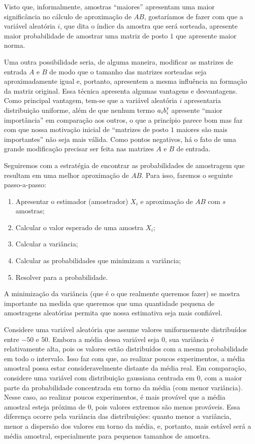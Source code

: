
Visto que, informalmente, amostras ``maiores'' apresentam uma maior significância no cálculo de aproximação de $AB$, gostaríamos de fazer com que a variável aleatória $i$, que dita o índice da amostra que será sorteada, apresente maior probabilidade de amostrar uma matriz de posto $1$ que apresente maior norma.

Uma outra possibilidade seria, de alguma maneira, modificar as matrizes de entrada $A$ e $B$ de modo que o tamanho das matrizes sorteadas seja aproximadamente igual e, portanto, apresentem a mesma influência na formação da matriz original. Essa técnica apresenta algumas vantagens e desvantagens. Como principal vantagem, tem-se que a variável aleatória $i$ apresentaria distribuição uniforme, além de que nenhum termo $a_ib_i^{\scriptscriptstyle\mathsf{T}\mkern-1mu}$ apresente ``maior importância'' em comparação aos outros, o que a princípio parece bom mas faz com que nossa motivação inicial de ``matrizes de posto $1$ maiores são mais importantes'' não seja mais válida. Como pontos negativos, há o fato de uma grande modificação precisar ser feita nas matrizes $A$ e $B$ de entrada.

Seguiremos com a estratégia de encontrar as probabilidades de amostragem que resultam em uma melhor aproximação de $AB$. Para isso, faremos o seguinte passo-a-passo:

\begin{enumerate}
  \item Apresentar o estimador (amostrador) $X_i$ e aproximação de $AB$ com $s$ amostras;
  \item Calcular o valor esperado de uma amostra $X_i$;
  \item Calcular a variância;
  \item Calcular as probabilidades que minimizam a variância;
  \item Resolver para a probabilidade.
\end{enumerate}

A minimização da variância (que é o que realmente queremos fazer) se mostra importante na medida que queremos que uma quantidade pequena de amostragens aleatórias permita que nossa estimativa seja mais confiável.

Considere uma variável aleatória que assume valores uniformemente distribuídos entre $-50$ e $50$. Embora a média dessa variável seja $0$, sua variância é relativamente alta, pois os valores estão distribuídos com a mesma probabilidade em todo o intervalo. Isso faz com que, ao realizar poucos experimentos, a média amostral possa estar consideravelmente distante da média real. Em comparação, considere uma variável com distribuição gaussiana centrada em $0$, com a maior parte da probabilidade concentrada em torno da média (com menor variância). Nesse caso, ao realizar poucos experimentos, é mais provável que a média amostral esteja próxima de 0, pois valores extremos são menos prováveis. Essa diferença ocorre pela variância das distribuições: quanto menor a variância, menor a dispersão dos valores em torno da média, e, portanto, mais estável será a média amostral, especialmente para pequenos tamanhos de amostra.

